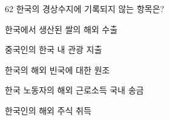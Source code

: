 \begin{question}{62}
한국의 경상수지에 기록되지 않는 항목은?
\begin{choices}
  \item 한국에서 생산된 쌀의 해외 수출
  \item 중국인의 한국 내 관광 지출
  \item 한국의 해외 빈국에 대한 원조
  \item 한국 노동자의 해외 근로소득 국내 송금
  \item 한국인의 해외 주식 취득
\end{choices}
\end{question}

